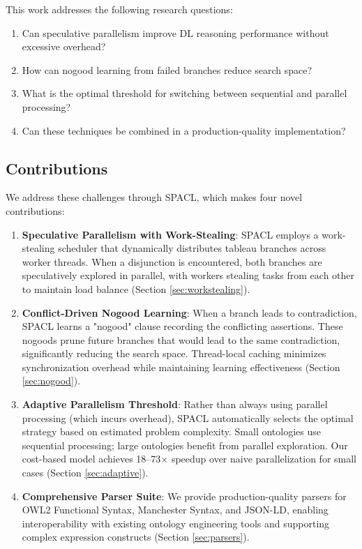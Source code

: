 \documentclass[preprint,12pt]{elsarticle}
\begin{document}
This work addresses the following research questions:

\begin{enumerate}[RQ1:]
    \item Can speculative parallelism improve DL reasoning performance without excessive overhead?
    \item How can nogood learning from failed branches reduce search space?
    \item What is the optimal threshold for switching between sequential and parallel processing?
    \item Can these techniques be combined in a production-quality implementation?
\end{enumerate}

\subsection{Contributions}
\label{sec:contributions}

We address these challenges through SPACL, which makes four novel contributions:

\begin{enumerate}[C1:]
    \item \textbf{Speculative Parallelism with Work-Stealing}: SPACL employs a work-stealing scheduler that dynamically distributes tableau branches across worker threads. When a disjunction is encountered, both branches are speculatively explored in parallel, with workers stealing tasks from each other to maintain load balance (Section \ref{sec:workstealing}).
    
    \item \textbf{Conflict-Driven Nogood Learning}: When a branch leads to contradiction, SPACL learns a "nogood" clause recording the conflicting assertions. These nogoods prune future branches that would lead to the same contradiction, significantly reducing the search space. Thread-local caching minimizes synchronization overhead while maintaining learning effectiveness (Section \ref{sec:nogood}).
    
    \item \textbf{Adaptive Parallelism Threshold}: Rather than always using parallel processing (which incurs overhead), SPACL automatically selects the optimal strategy based on estimated problem complexity. Small ontologies use sequential processing; large ontologies benefit from parallel exploration. Our cost-based model achieves 18--73$\times$ speedup over naive parallelization for small cases (Section \ref{sec:adaptive}).
    
    \item \textbf{Comprehensive Parser Suite}: We provide production-quality parsers for OWL2 Functional Syntax, Manchester Syntax, and JSON-LD, enabling interoperability with existing ontology engineering tools and supporting complex expression constructs (Section \ref{sec:parsers}).
\end{enumerate}
\end{document}
